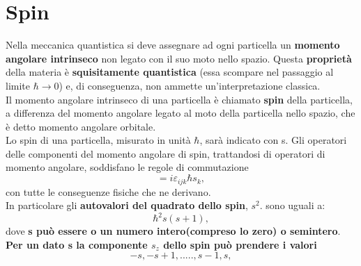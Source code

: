 \documentclass[a4paper,12pt,oneside]{book}
\newcommand*{\myfont}{\fontfamily{ppl}\selectfont}
\begin{document}
\fancypagestyle{plain}{%
\fancyhf{} %
\fancyfoot[C]{\bfseries \myfont{\thepage}} %
\renewcommand{\headrulewidth}{0pt}
\renewcommand{\footrulewidth}{0pt}}

\fancypagestyle{VS}{
\headheight = 15pt
\lhead[\myfont{\textit{\textbf{\thechapter\nouppercase{\leftmark}}}}]{\myfont{\textit{\textbf{\nouppercase{\leftmark}}}}}
\chead[]{}
\rhead[\myfont{\textbf{\thepage}}]{\myfont{\textbf{\thepage}}}

\lfoot[]{}
\cfoot[]{}
\rfoot[]{}
}



\pagestyle{VS}
\setcounter{chapter}{17}
\setcounter{page}{186}
\chapter{Spin}
Nella meccanica quantistica si deve assegnare ad ogni particella un \textbf{momento angolare intrinseco} non legato con il suo moto nello spazio. Questa \textbf{proprietà} della materia è \textbf{squisitamente quantistica} (essa scompare nel passaggio al limite $\hbar\rightarrow0$) e, di conseguenza, non ammette un'interpretazione classica.\\ Il momento angolare intrinseco di una particella è chiamato \textbf{spin} della particella, a differenza del momento angolare legato al moto della particella nello spazio, che è detto momento angolare orbitale.\\ Lo spin di una particella, misurato in unità $\hbar$, sarà indicato con s. Gli operatori delle componenti del momento angolare di spin, trattandosi di operatori di momento angolare, soddisfano le regole di commutazione
\begin{equation}
[s_{i},s_{j}]=i\varepsilon_{ijk}\hbar s_{k} ,
\label{18.1}
\end{equation}
con tutte le conseguenze fisiche che ne derivano.\\
In particolare gli \textbf{autovalori del quadrato dello spin}, $s^{2}$. sono uguali a:
\begin{equation}
\hbar^{2}s(s+1) ,
\end{equation}
dove \textbf{s può essere o un numero intero(compreso lo zero) o semintero}.\\ \textbf{Per un dato s la componente $s_{z}$ dello spin può prendere i valori}
\begin{equation}
-s, -s+1,.....,s-1,s ,
\end{equation}
\end{document}
